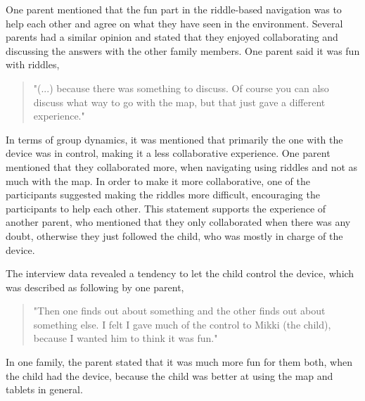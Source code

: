 One parent mentioned that the fun part in the riddle-based navigation was to help each other and agree on what they have seen in the environment. Several parents had a similar opinion and stated that they enjoyed collaborating and discussing the answers with the other family members. One parent said it was fun with riddles, 

\begin{quote}
    "(...) because there was something to discuss. Of course you can also discuss what way to go with the map, but that just gave a different experience."
\end{quote}

In terms of group dynamics, it was mentioned that primarily the one with the device was in control, making it a less collaborative experience. One parent mentioned that they collaborated more, when navigating using riddles and not as much with the map. In order to make it more collaborative, one of the participants suggested making the riddles more difficult, encouraging the participants to help each other. This statement supports the experience of another parent, who mentioned that they only collaborated when there was any doubt, otherwise they just followed the child, who was mostly in charge of the device. 

The interview data revealed a tendency to let the child control the device, which was described as following by one parent,  

\begin{quote}
    "Then one finds out about something and the other finds out about something else. I 
felt I gave much of the control to Mikki (the child), because I wanted him to think it 
was fun."
\end{quote}
 
In one family, the parent stated that it was much more fun for them both, when the child had the device, because the child was better at using the map and tablets in general.